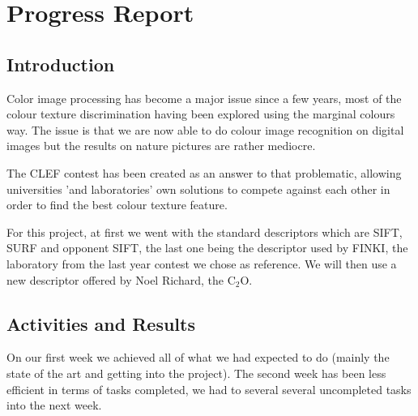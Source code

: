 \documentclass[12pt]{article}
\begin{document}
\section*{Progress Report}

\subsection*{Introduction}
Color image processing has become a major issue since a few years, most of the colour texture discrimination having been explored using the marginal colours way. The issue is that we are now able to do colour image recognition on digital images but the results on nature pictures are rather mediocre.

The CLEF contest has been created as an answer to that problematic, allowing universities 'and laboratories' own solutions to compete against each other in order to find the best colour texture feature.

 For this project, at first we went with the standard descriptors which are SIFT, SURF and opponent SIFT, the last one being the descriptor used by FINKI, the laboratory from the last year contest we chose as reference. We will then use a new descriptor offered by Noel Richard, the C$_2$O.

\subsection*{Activities and Results}
On our first week we achieved all of what we had expected to do (mainly the state of the art and getting into the project).
The second week has been less efficient in terms of tasks completed, we had to several several uncompleted tasks into the next week.
\end{document}
